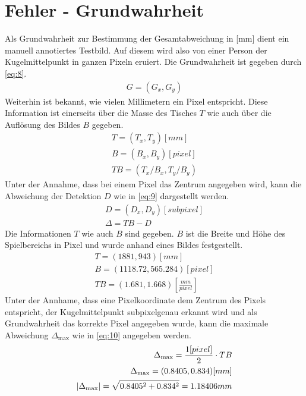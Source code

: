 \section{Fehler - Grundwahrheit}\label{anhang:fehler:grundwahrheit}
Als Grundwahrheit zur Bestimmung der Gesamtabweichung in [mm] dient ein manuell annotiertes Testbild.
Auf diesem wird also von einer Person der Kugelmittelpunkt in ganzen Pixeln eruiert. Die Grundwahrheit
ist gegeben durch \ref{eq:8}.
\begin{align}
    G = (G_x, G_y)\label{eq:8}
\end{align}
Weiterhin ist bekannt, wie vielen Millimetern ein Pixel entspricht. Diese Information ist einerseits über die Masse des
Tisches $T$ wie auch über die Auflösung des Bildes $B$ gegeben.
\begin{align}
    T = (T_x, T_y) [mm]\\
    B = (B_x, B_y) [pixel]\\
    TB = (T_x/B_x, T_y/B_y)
\end{align}
Unter der Annahme, dass bei einem Pixel das Zentrum angegeben wird, kann die Abweichung der Detektion $D$ wie in \ref{eq:9}
dargestellt werden.
\begin{align}
    D = (D_x, D_y) [subpixel]\\
    \Delta = TB - D\label{eq:9}
\end{align}
Die Informationen $T$ wie auch $B$ sind gegeben.
$B$ ist die Breite und Höhe des Spielbereichs in Pixel und wurde anhand eines Bildes festgestellt.
\begin{align}
    T = (1881, 943) [mm]\\
    B = (1118.72, 565.284) [pixel]\\
    TB = (1.681, 1.668) [\frac{mm}{pixel}]
\end{align}
Unter der Annhame, dass eine Pixelkoordinate dem Zentrum des Pixels entspricht, der Kugelmittelpunkt
subpixelgenau erkannt wird und als Grundwahrheit das korrekte Pixel angegeben wurde, kann die
maximale Abweichung $\Delta_{\max}$ wie in \ref{eq:10} angegeben werden.
\begin{align}
    \Delta_{\max} = \frac{1 [pixel]}{2} \cdot TB\label{eq:10}\\
    \Delta_{\max} = (0.8405, 0.834) [mm]\\
    \lvert \Delta_{\max} \rvert = \sqrt{0.8405^2 +  0.834^2} = 1.18406 mm
\end{align}
